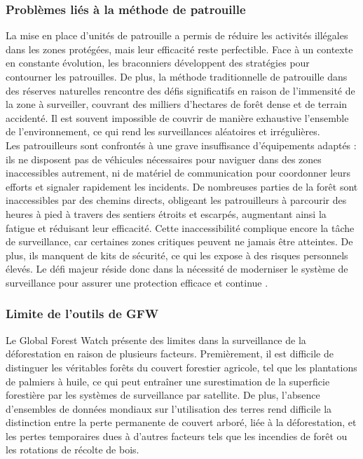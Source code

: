 \subsubsection{Problèmes liés à la méthode de patrouille}
La mise en place d'unités de patrouille a permis de réduire les activités illégales dans les zones protégées, mais leur efficacité reste perfectible. Face à un contexte en constante évolution, les braconniers développent des stratégies pour contourner les patrouilles. De plus, la méthode traditionnelle de patrouille dans des réserves naturelles rencontre des défis significatifs en raison de l'immensité de la zone à surveiller, couvrant des milliers d'hectares de forêt dense et de terrain accidenté. Il est souvent impossible de couvrir de manière exhaustive l'ensemble de l'environnement, ce qui rend les surveillances aléatoires et irrégulières. 
\\

Les patrouilleurs sont confrontés à une grave insuffisance d'équipements adaptés : ils ne disposent pas de véhicules nécessaires pour naviguer dans des zones inaccessibles autrement, ni de matériel de communication pour coordonner leurs efforts et signaler rapidement les incidents. De nombreuses parties de la forêt sont inaccessibles par des chemins directs, obligeant les patrouilleurs à parcourir des heures à pied à travers des sentiers étroits et escarpés, augmentant ainsi la fatigue et réduisant leur efficacité. Cette inaccessibilité complique encore la tâche de surveillance, car certaines zones critiques peuvent ne jamais être atteintes. De plus, ils manquent de kits de sécurité, ce qui les expose à des risques personnels élevés. Le défi majeur réside donc dans la nécessité de moderniser le système de surveillance pour assurer une protection efficace et continue \cite{55}.

\subsubsection{Limite de l’outils de GFW }
Le Global Forest Watch présente des limites dans la surveillance de la déforestation en raison de plusieurs facteurs. Premièrement, il est difficile de distinguer les véritables forêts du couvert forestier agricole, tel que les plantations de palmiers à huile, ce qui peut entraîner une surestimation de la superficie forestière par les systèmes de surveillance par satellite. De plus, l'absence d'ensembles de données mondiaux sur l'utilisation des terres rend difficile la distinction entre la perte permanente de couvert arboré, liée à la déforestation, et les pertes temporaires dues à d'autres facteurs tels que les incendies de forêt ou les rotations de récolte de bois.
\\

